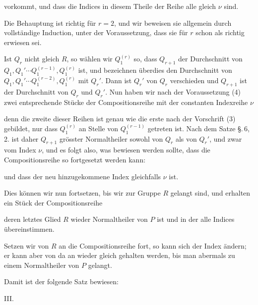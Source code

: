 
vorkommt, und dass die Indices in diesem Theile der Reihe alle
gleich $\nu$ sind.

Die Behauptung ist richtig für $r = 2$, und wir beweisen sie
allgemein durch vollständige Induction, unter der Voraussetzung,
dass sie für $r$ schon als richtig erwiesen sei.

Ist $Q_r$ nicht gleich $R$, so wählen wir $Q_1^{(r)}$ so, dass $Q_{r+1}$ der
Durchschnitt von $Q_1, Q_1' \cdots Q_1^{(r-1)}, Q_1^{(r)}$ ist, und bezeichnen überdies
 den Durchschnitt von $Q_1, Q_1' \cdots Q_1^{(r-2)}, Q_1^{(r)}$ mit $Q_r'$. Dann
ist $Q_r'$ von $Q_r$ verschieden und $Q_{r+1}$ ist der Durchschnitt von
$Q_r$ und $Q_r'$. Nun haben wir nach der Voraussetzung (4) zwei
entsprechende Stücke der Compositionsreihe mit der constanten
Indexreihe $\nu$


denn die zweite dieser Reihen ist genau wie die erste nach der
Vorschrift (3) gebildet, nur dass $Q_1^{(r)}$ an Stelle von $Q_1^{(r-1)}$ getreten
ist. Nach dem Satze \S.\,6, 2. ist daher $Q_{r+1}$ grösster Normaltheiler
 sowohl von $Q_r$ als von $Q_r'$, und zwar vom Index $\nu$, und
es folgt also, was bewiesen werden sollte, dass die Compositionsreihe
 so fortgesetzt werden kann:


und dass der neu hinzugekommene Index gleichfalls $\nu$ ist.

Dies können wir nun fortsetzen, bis wir zur Gruppe $R$ gelangt
 sind, und erhalten ein Stück der Compositionsreihe


deren letztes Glied $R$ wieder Normaltheiler von $P$ ist und in
der alle Indices übereinstimmen.

Setzen wir von $R$ an die Compositionsreihe fort, so kann
sich der Index ändern; er kann aber von da an wieder gleich
gehalten werden, bis man abermals zu einem Normaltheiler von
$P$ gelangt.

Damit ist der folgende Satz bewiesen:

III.\ 


